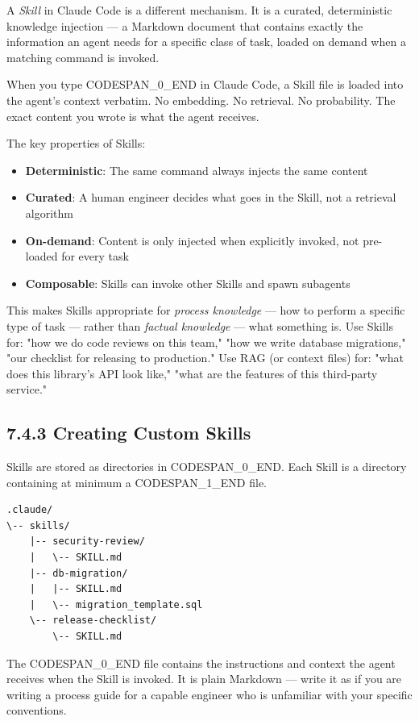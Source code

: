 \documentclass[11pt,a4paper]{book}
\begin{document}
A \textit{Skill} in Claude Code is a different mechanism. It is a curated, deterministic knowledge injection --- a Markdown document that contains exactly the information an agent needs for a specific class of task, loaded on demand when a matching command is invoked.

When you type CODESPAN\_0\_END in Claude Code, a Skill file is loaded into the agent's context verbatim. No embedding. No retrieval. No probability. The exact content you wrote is what the agent receives.

The key properties of Skills:

\begin{itemize}
  \item \textbf{Deterministic}: The same command always injects the same content
  \item \textbf{Curated}: A human engineer decides what goes in the Skill, not a retrieval algorithm
  \item \textbf{On-demand}: Content is only injected when explicitly invoked, not pre-loaded for every task
  \item \textbf{Composable}: Skills can invoke other Skills and spawn subagents
\end{itemize}

This makes Skills appropriate for \textit{process knowledge} --- how to perform a specific type of task --- rather than \textit{factual knowledge} --- what something is. Use Skills for: "how we do code reviews on this team," "how we write database migrations," "our checklist for releasing to production." Use RAG (or context files) for: "what does this library's API look like," "what are the features of this third-party service."

\subsection{7.4.3 Creating Custom Skills}

Skills are stored as directories in CODESPAN\_0\_END. Each Skill is a directory containing at minimum a CODESPAN\_1\_END file.

\begin{lstlisting}
.claude/
\-- skills/
    |-- security-review/
    |   \-- SKILL.md
    |-- db-migration/
    |   |-- SKILL.md
    |   \-- migration_template.sql
    \-- release-checklist/
        \-- SKILL.md
\end{lstlisting}

The CODESPAN\_0\_END file contains the instructions and context the agent receives when the Skill is invoked. It is plain Markdown --- write it as if you are writing a process guide for a capable engineer who is unfamiliar with your specific conventions.
\end{document}

